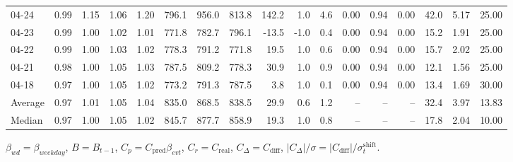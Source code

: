 \begin{threeparttable}
{\begin{tabular}{lrrrrrrrrrrrrrrrr}
  04-24 &         0.99 &           1.15 &          1.06 &          1.20 & 796.1 & 956.0 & 813.8 &      142.2 &                      1.0 &                 4.6 &       0.00 &      0.94 &           0.00 &             42.0 &            5.17 &                  25.00 \\
  04-23 &         0.99 &           1.00 &          1.02 &          1.01 & 771.8 & 782.7 & 796.1 &      -13.5 &                     -1.0 &                 0.4 &       0.00 &      0.94 &           0.00 &             15.2 &            1.91 &                  25.00 \\
  04-22 &         0.99 &           1.00 &          1.03 &          1.02 & 778.3 & 791.2 & 771.8 &       19.5 &                      1.0 &                 0.6 &       0.00 &      0.94 &           0.00 &             15.7 &            2.02 &                  25.00 \\
  04-21 &         0.98 &           1.00 &          1.05 &          1.03 & 787.5 & 809.2 & 778.3 &       30.9 &                      1.0 &                 0.9 &       0.00 &      0.94 &           0.00 &             12.1 &            1.56 &                  25.00 \\
  04-18 &         0.97 &           1.00 &          1.05 &          1.02 & 773.2 & 791.3 & 787.5 &        3.8 &                      1.0 &                 0.1 &       0.00 &      0.94 &           0.00 &             13.4 &            1.69 &                  30.00 \\
Average &         0.97 &           1.01 &          1.05 &          1.04 & 835.0 & 868.5 & 838.5 &       29.9 &                      0.6 &                 1.2 &         -- &        -- &             -- &             32.4 &            3.97 &                  13.83 \\
 Median &         0.97 &           1.00 &          1.05 &          1.02 & 845.7 & 877.7 & 858.9 &       19.3 &                      1.0 &                 0.8 &         -- &        -- &             -- &             17.8 &            2.04 &                  10.00 \\
\bottomrule
\end{tabular}
}
\begin{tablenotes}\footnotesize
\item $\beta_{wd}=\beta_{weekday}$, $B=B_{t-1}$,
$C_p=C_{\text{pred}}\beta_{evt}$, $C_r=C_{\text{real}}$,
$C_\Delta=C_{\text{diff}}$, $|C_\Delta|/\sigma=|C_{\text{diff}}|/\sigma_t^{\text{shift}}$.
\end{tablenotes}
\end{threeparttable}
\endgroup
